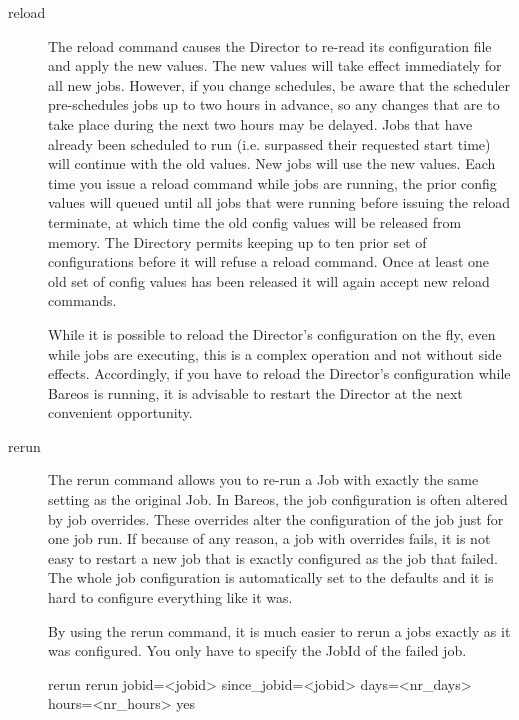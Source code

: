 \begin{description}
\item [reload]
   The reload command causes the Director to re-read its configuration
   file and apply the new values. The new values will take effect
   immediately for all new jobs.  However, if you change schedules,
   be aware that the scheduler pre-schedules jobs up to two hours in
   advance, so any changes that are to take place during the next two
   hours may be delayed.  Jobs that have already been scheduled to run
   (i.e. surpassed their requested start time) will continue with the
   old values.  New jobs will use the new values. Each time you issue
   a reload command while jobs are running, the prior config values
   will queued until all jobs that were running before issuing
   the reload terminate, at which time the old config values will
   be released from memory. The Directory permits keeping up to
   ten prior set of configurations before it will refuse a reload
   command. Once at least one old set of config values has been
   released it will again accept new reload commands.

   While it is possible to reload the Director's configuration on the fly,
   even while jobs are executing, this is a complex operation and not
   without side effects.  Accordingly, if you have to reload the Director's
   configuration while Bareos is running, it is advisable to restart the
   Director at the next convenient opportunity.

\item [rerun]
   The rerun command allows you to re-run a Job with exactly the same setting
   as the original Job. In Bareos, the job configuration is often altered by job
   overrides. These overrides alter the configuration of the job just for one job run.
   If because of any reason, a job with overrides fails, it is not easy to restart
   a new job that is exactly configured as the job that failed. The whole job
   configuration is automatically set to the defaults and it is hard to
   configure everything like it was.

   By using the rerun command, it is much easier to rerun a jobs exactly
   as it was configured. You only have to specify the JobId of the failed job.

\begin{bconsole}{rerun}
rerun jobid=<jobid> since_jobid=<jobid> days=<nr_days> hours=<nr_hours> yes
\end{bconsole}


\end{description}
